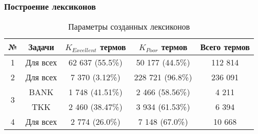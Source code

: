 \subsubsection{Построение лексиконов}

\begin{table}[ht!]
\centering
\caption{Параметры созданных лексиконов}
\label{my-label}
\begin{tabular}{|c|c|c|c|c|}
\hline
№                  & \multicolumn{1}{c|}{Задачи} & \multicolumn{1}{c|}{$K_{Excellent}$ термов} & \multicolumn{1}{c|}{$K_{Poor}$ термов} & \multicolumn{1}{c|}{Всего термов} \\ \hline
1                  & Для всех                    & 62 637 (55.5\%)                              & 50 177 (44.5\%)                         & 112 814                            \\ \hline
2                  & Для всех                    & 7 370 (3.12\%)                               & 228 721 (96.8\%)                        & 236 091                            \\ \hline
\multirow{2}{*}{3} & BANK                        & 1 748 (41.51\%)                              & 2 466 (58.56\%)                         & 4 211                              \\ \cline{2-5}
                   & TKK                         & 2 460 (38.47\%)                              & 3 934 (61.53\%)                         & 6 394                              \\ \hline
4                  & Для всех                    & 2 774 (26.0\%)                               & 7 148 (67.0\%)                          & 10 668                             \\ \hline
\end{tabular}
\end{table}
